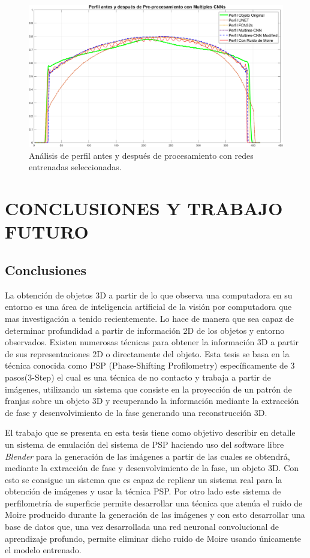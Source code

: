 \documentclass[10pt,letterpaper]{article}
\begin{document}
\begin{figure}[H]
	\centering
    \includegraphics[width=1\textwidth]{tifs/tif97.png}
    \caption{Análisis de perfil antes y después de procesamiento con redes entrenadas seleccionadas.}
    \label{tif97}
\end{figure}

\section{CONCLUSIONES Y TRABAJO FUTURO}
\subsection{Conclusiones}

La obtención de objetos 3D a partir de lo que observa una computadora en su entorno es una área de inteligencia artificial de la visión por computadora que mas investigación a tenido recientemente. Lo hace de manera que sea capaz de determinar profundidad a partir de información 2D de los objetos y entorno observados. Existen numerosas técnicas para obtener la información 3D a partir de sus representaciones 2D o directamente del objeto. Esta tesis se basa en la técnica conocida como PSP (Phase-Shifting Profilometry) específicamente de 3 pasos(3-Step) el cual es una técnica de no contacto y trabaja a partir de imágenes, utilizando un sistema que consiste en la proyección de un patrón de franjas sobre un objeto 3D y recuperando la información mediante la extracción de fase y desenvolvimiento de la fase generando una reconstrucción 3D.

El trabajo que se presenta en esta tesis tiene como objetivo describir en detalle un sistema de emulación del sistema de PSP haciendo uso del software libre \textit{Blender} para la generación de las imágenes a partir de las cuales se obtendrá, mediante la extracción de fase y desenvolvimiento de la fase, un objeto 3D. Con esto se consigue un sistema que es capaz de replicar un sistema real para la obtención de imágenes y usar la técnica PSP. Por otro lado este sistema de perfilometría de superficie permite desarrollar una técnica que atenúa el ruido de Moire producido durante la generación de las imágenes y con esto desarrollar una base de datos que, una vez desarrollada una red neuronal convolucional de aprendizaje profundo, permite eliminar dicho ruido de Moire usando únicamente el modelo entrenado.
\end{document}
